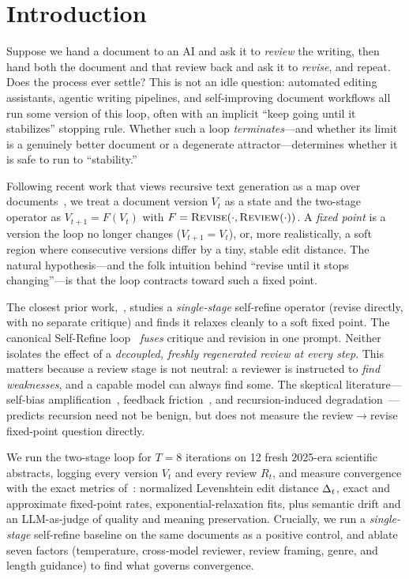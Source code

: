 \section{Introduction}
\label{sec:intro}

Suppose we hand a document to an AI and ask it to \emph{review} the writing, then hand
both the document and that review back and ask it to \emph{revise}, and repeat. Does the
process ever settle? This is not an idle question: automated editing assistants, agentic
writing pipelines, and self-improving document workflows all run some version of this loop,
often with an implicit ``keep going until it stabilizes'' stopping rule. Whether such a loop
\emph{terminates}---and whether its limit is a genuinely better document or a degenerate
attractor---determines whether it is safe to run to ``stability.''

 Following recent work that views recursive text
generation as a map over documents~\citep{wu2026converge}, we treat a document version
$V_t$ as a state and the two-stage operator as $V_{t+1} = F(V_t)$ with
$F = \textsc{Revise}(\cdot, \textsc{Review}(\cdot))$. A \emph{fixed point} is a version the loop no longer
changes ($V_{t+1} = V_t$), or, more realistically, a soft region where consecutive versions
differ by a tiny, stable edit distance. The natural hypothesis---and the folk intuition
behind ``revise until it stops changing''---is that the loop contracts toward such a fixed
point.

 The closest prior work,~\citet{wu2026converge}, studies a
\emph{single-stage} self-refine operator (revise directly, with no separate critique) and
finds it relaxes cleanly to a soft fixed point. The canonical Self-Refine
loop~\citep{madaan2023selfrefine} \emph{fuses} critique and revision in one prompt. Neither
isolates the effect of a \emph{decoupled, freshly regenerated review at every step}. This
matters because a review stage is not neutral: a reviewer is instructed to \emph{find
weaknesses}, and a capable model can always find some. The skeptical
literature---self-bias amplification~\citep{xu2024pride}, feedback
friction~\citep{feedbackfriction2025}, and recursion-induced
degradation~\citep{shumailov2023curse}---predicts recursion need not be benign, but does not
measure the review$\to$revise fixed-point question directly.

 We run the two-stage loop for $T=8$ iterations on 12 fresh 2025-era
scientific abstracts, logging every version $V_t$ and every review $R_t$, and measure
convergence with the exact metrics of~\citet{wu2026converge}: normalized Levenshtein edit
distance $\Delta_t$, exact and approximate fixed-point rates, exponential-relaxation fits, plus
semantic drift and an LLM-as-judge of quality and meaning preservation. Crucially, we run a
\emph{single-stage} self-refine baseline on the same documents as a positive control, and
ablate seven factors (temperature, cross-model reviewer, review framing, genre, and length
guidance) to find what governs convergence.

